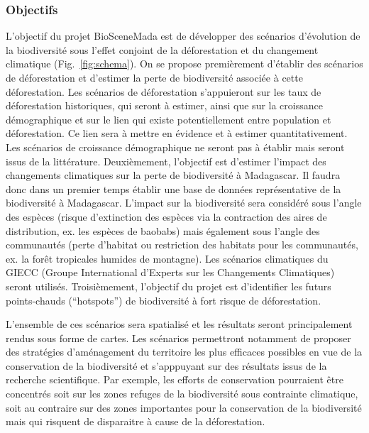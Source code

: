 \documentclass[12pt,]{article}
\begin{document}
\hypertarget{objectifs}{%
\subsubsection{Objectifs}\label{objectifs}}

L'objectif du projet BioSceneMada est de développer des scénarios
d'évolution de la biodiversité sous l'effet conjoint de la déforestation
et du changement climatique (Fig.~\ref{fig:schema}). On se propose
premièrement d'établir des scénarios de déforestation et d'estimer la
perte de biodiversité associée à cette déforestation. Les scénarios de
déforestation s'appuieront sur les taux de déforestation historiques,
qui seront à estimer, ainsi que sur la croissance démographique et sur
le lien qui existe potentiellement entre population et déforestation. Ce
lien sera à mettre en évidence et à estimer quantitativement. Les
scénarios de croissance démographique ne seront pas à établir mais
seront issus de la littérature. Deuxièmement, l'objectif est d'estimer
l'impact des changements climatiques sur la perte de biodiversité à
Madagascar. Il faudra donc dans un premier temps établir une base de
données représentative de la biodiversité à Madagascar. L'impact sur la
biodiversité sera considéré sous l'angle des espèces (risque
d'extinction des espèces via la contraction des aires de distribution,
ex. les espèces de baobabs) mais également sous l'angle des communautés
(perte d'habitat ou restriction des habitats pour les communautés, ex.
la forêt tropicales humides de montagne). Les scénarios climatiques du
GIECC (Groupe International d'Experts sur les Changements Climatiques)
seront utilisés. Troisièmement, l'objectif du projet est d'identifier
les futurs points-chauds (``hotspots'') de biodiversité à fort risque de
déforestation.

L'ensemble de ces scénarios sera spatialisé et les résultats seront
principalement rendus sous forme de cartes. Les scénarios permettront
notamment de proposer des stratégies d'aménagement du territoire les
plus efficaces possibles en vue de la conservation de la biodiversité et
s'apppuyant sur des résultats issus de la recherche scientifique. Par
exemple, les efforts de conservation pourraient être concentrés soit sur
les zones refuges de la biodiversité sous contrainte climatique, soit au
contraire sur des zones importantes pour la conservation de la
biodiversité mais qui risquent de disparaitre à cause de la
déforestation.
\end{document}
